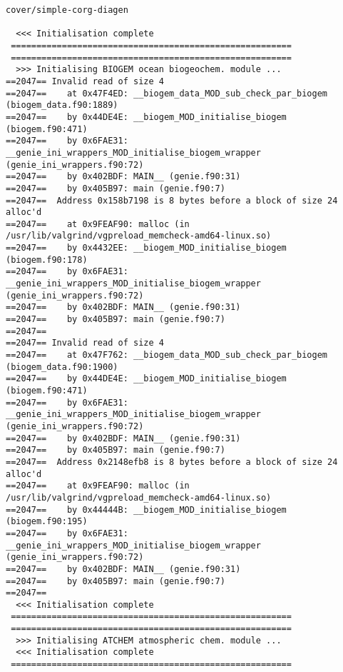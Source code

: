 \documentclass[a4paper,10pt,article]{memoir}
\begin{document}
\begin{verbatim}
cover/simple-corg-diagen

  <<< Initialisation complete
 =======================================================
 =======================================================
  >>> Initialising BIOGEM ocean biogeochem. module ...
==2047== Invalid read of size 4
==2047==    at 0x47F4ED: __biogem_data_MOD_sub_check_par_biogem (biogem_data.f90:1889)
==2047==    by 0x44DE4E: __biogem_MOD_initialise_biogem (biogem.f90:471)
==2047==    by 0x6FAE31: __genie_ini_wrappers_MOD_initialise_biogem_wrapper (genie_ini_wrappers.f90:72)
==2047==    by 0x402BDF: MAIN__ (genie.f90:31)
==2047==    by 0x405B97: main (genie.f90:7)
==2047==  Address 0x158b7198 is 8 bytes before a block of size 24 alloc'd
==2047==    at 0x9FEAF90: malloc (in /usr/lib/valgrind/vgpreload_memcheck-amd64-linux.so)
==2047==    by 0x4432EE: __biogem_MOD_initialise_biogem (biogem.f90:178)
==2047==    by 0x6FAE31: __genie_ini_wrappers_MOD_initialise_biogem_wrapper (genie_ini_wrappers.f90:72)
==2047==    by 0x402BDF: MAIN__ (genie.f90:31)
==2047==    by 0x405B97: main (genie.f90:7)
==2047==
==2047== Invalid read of size 4
==2047==    at 0x47F762: __biogem_data_MOD_sub_check_par_biogem (biogem_data.f90:1900)
==2047==    by 0x44DE4E: __biogem_MOD_initialise_biogem (biogem.f90:471)
==2047==    by 0x6FAE31: __genie_ini_wrappers_MOD_initialise_biogem_wrapper (genie_ini_wrappers.f90:72)
==2047==    by 0x402BDF: MAIN__ (genie.f90:31)
==2047==    by 0x405B97: main (genie.f90:7)
==2047==  Address 0x2148efb8 is 8 bytes before a block of size 24 alloc'd
==2047==    at 0x9FEAF90: malloc (in /usr/lib/valgrind/vgpreload_memcheck-amd64-linux.so)
==2047==    by 0x44444B: __biogem_MOD_initialise_biogem (biogem.f90:195)
==2047==    by 0x6FAE31: __genie_ini_wrappers_MOD_initialise_biogem_wrapper (genie_ini_wrappers.f90:72)
==2047==    by 0x402BDF: MAIN__ (genie.f90:31)
==2047==    by 0x405B97: main (genie.f90:7)
==2047==
  <<< Initialisation complete
 =======================================================
 =======================================================
  >>> Initialising ATCHEM atmospheric chem. module ...
  <<< Initialisation complete
 =======================================================



\end{verbatim}
\end{document}
